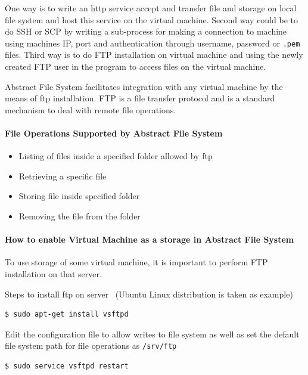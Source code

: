 One way is to write an http service accept and transfer file and
storage on local file system and host this service on the virtual
machine. Second way could be to do SSH or SCP by writing a sub-process
for making a connection to machine using machines IP, port and
authentication through username, password or \verb|.pem| files. Third
way is to do FTP installation on virtual machine and using the newly
created FTP user in the program to access files on the virtual
machine.


Abstract File System facilitates integration with any virtual machine
by the means of ftp installation. FTP is a file transfer protocol and
is a standard mechanism to deal with remote file operations.


\paragraph{File Operations Supported by Abstract File System }


\begin{itemize}
    \item  Listing of files inside a specified folder allowed by ftp
    \item  Retrieving a specific file 
    \item  Storing file inside specified folder
    \item  Removing the file from the folder
\end{itemize}   

\paragraph{How to enable Virtual Machine as a storage in Abstract File System}

To use storage of some virtual machine, it is important to perform 
FTP installation on that server. 

Steps to install ftp on server~\cite{hid-sp18-420-FTP}
(Ubuntu Linux distribution is taken as example)


\begin{verbatim}
$ sudo apt-get install vsftpd
\end{verbatim}

Edit the configuration file to allow writes to file system as well as set the 
default file system path for file operations as \verb|/srv/ftp|

\begin{verbatim}
$ sudo service vsftpd restart
\end{verbatim}



